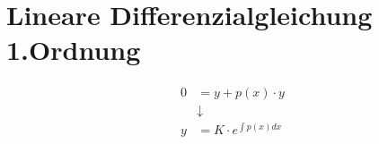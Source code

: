 \section{Lineare Differenzialgleichung 1.Ordnung}
\begin{center}
\begin{align*}[box=\widebox]
0 &= y + p(x)\cdot y \\
&\downarrow \\
y &= K\cdot e^{\int p(x)dx}
\end{align*}
\end{center}